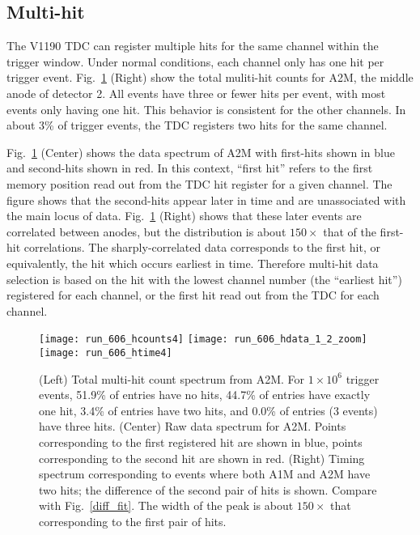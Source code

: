 \subsection{Multi-hit}
The V1190 TDC can register multiple hits for the same channel within the trigger window. Under normal conditions, each channel only has one hit per trigger event.
Fig.~\ref{mhit} (Right) show the total muliti-hit counts for A2M, the middle anode of detector 2. All events have three or fewer hits per event, with most events only having one hit. This behavior is consistent for the other channels. In about 3\% of trigger events, the TDC registers two hits for the same channel.

 Fig.~\ref{mhit} (Center) shows the data spectrum of A2M with first-hits shown in blue and second-hits shown in red. In this context, ``first hit'' refers to the first memory position read out from the TDC hit register for a given channel. The figure shows that the second-hits appear later in time and are unassociated with the main locus of data. Fig.~\ref{mhit} (Right) shows that these later events are correlated between anodes, but the distribution is about $150\times$ that of the first-hit correlations. The sharply-correlated data corresponds to the first hit, or equivalently, the hit which occurs earliest in time. Therefore multi-hit data selection is based on the hit with the lowest channel number (the ``earliest hit'') registered for each channel, or the first hit read out from the TDC for each channel.

\begin{figure}
\centering
\centerline{
\hspace{\fill}
\texttt{[image: run\_606\_hcounts4]}\hspace{\fill}
\texttt{[image: run\_606\_hdata\_1\_2\_zoom]}\hspace{\fill}
\texttt{[image: run\_606\_htime4]}\hspace{\fill}
}
\caption{(Left) Total multi-hit count spectrum from A2M. For $1\times10^6$ trigger events, 51.9\% of entries have no hits, 44.7\% of entries have exactly one hit, 3.4\% of entries have two hits, and 0.0\% of entries (3 events) have three hits. (Center) Raw data spectrum for A2M. Points corresponding to the first registered hit are shown in blue, points corresponding to the second hit are shown in red. (Right) Timing spectrum corresponding to events where both A1M and A2M have two hits; the difference of the second pair of hits is shown.
Compare with Fig.~\ref{diff_fit}.
The width of the peak 
is about $150\times$ that corresponding to the first pair of hits. 
}
\label{mhit}
\end{figure}

